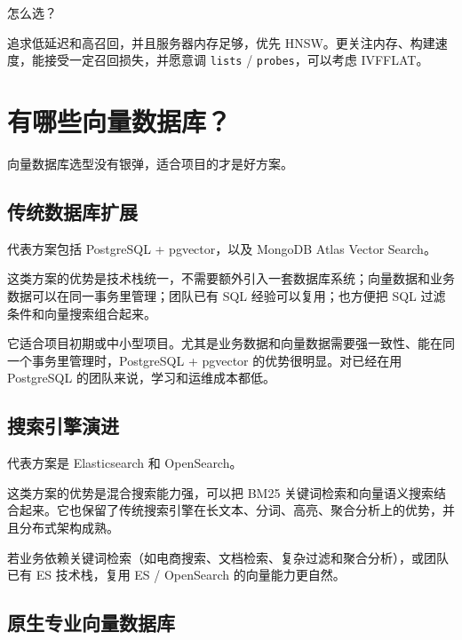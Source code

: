 \documentclass[9pt,a4paper,twocolumn]{ctexart}
\begin{document}
怎么选？



追求低延迟和高召回，并且服务器内存足够，优先 HNSW。更关注内存、构建速度，能接受一定召回损失，并愿意调 \texttt{lists} / \texttt{probes}，可以考虑 IVFFLAT。



\section*{有哪些向量数据库？}


向量数据库选型没有银弹，适合项目的才是好方案。



\subsection*{传统数据库扩展}


代表方案包括 PostgreSQL + pgvector，以及 MongoDB Atlas Vector Search。



这类方案的优势是技术栈统一，不需要额外引入一套数据库系统；向量数据和业务数据可以在同一事务里管理；团队已有 SQL 经验可以复用；也方便把 SQL 过滤条件和向量搜索组合起来。



它适合项目初期或中小型项目。尤其是业务数据和向量数据需要强一致性、能在同一个事务里管理时，PostgreSQL + pgvector 的优势很明显。对已经在用 PostgreSQL 的团队来说，学习和运维成本都低。



\subsection*{搜索引擎演进}


代表方案是 Elasticsearch 和 OpenSearch。



这类方案的优势是混合搜索能力强，可以把 BM25 关键词检索和向量语义搜索结合起来。它也保留了传统搜索引擎在长文本、分词、高亮、聚合分析上的优势，并且分布式架构成熟。



若业务依赖关键词检索（如电商搜索、文档检索、复杂过滤和聚合分析），或团队已有 ES 技术栈，复用 ES / OpenSearch 的向量能力更自然。



\subsection*{原生专业向量数据库}
\end{document}
